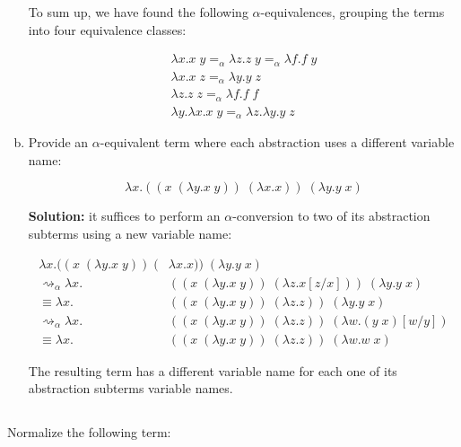 \documentclass{article}
\begin{document}
\begin{enumerate}[a)]
    To sum up, we have found the following $\alpha$-equivalences,
    grouping the terms into four equivalence classes:

    \begin{gather*}
      \lambda x.x\;y 
        =_\alpha \lambda z.z\;y 
        =_\alpha \lambda f.f\;y \\ 
      \lambda x.x\;z 
        =_\alpha \lambda y.y\;z \\ 
      \lambda z.z\;z
        =_\alpha \lambda f.f\;f \\ 
      \lambda y.\lambda x.x\;y 
        =_\alpha \lambda z.\lambda y.y\;z
    \end{gather*}

  \item Provide an $\alpha$-equivalent term where each abstraction 
    uses a different variable name:

    $$
      \lambda x.
        ((x\;(\lambda y.x\;y))\;(\lambda x.x))\;
        (\lambda y.y\;x)
    $$

    \textbf{Solution:} it suffices to perform an 
    $\alpha$-conversion to two of its abstraction subterms 
    using a new variable name:

    \begin{align*}
      \lambda x.
        ((x\;(\lambda y.x\;y))\;(&\lambda x.x))\;
        (\lambda y.y\;x) \\
      \rightsquigarrow_\alpha\lambda x.
        &((x\;(\lambda y.x\;y))\;(\lambda z.x[z/x]))\;
        (\lambda y.y\;x) \\
      \equiv\lambda x.
        &((x\;(\lambda y.x\;y))\;(\lambda z.z))\;
        (\lambda y.y\;x) \\
      \rightsquigarrow_\alpha\lambda x.
        &((x\;(\lambda y.x\;y))\;(\lambda z.z))\;
        (\lambda w.(y\;x)[w/y]) \\
      \equiv\lambda x.
        &((x\;(\lambda y.x\;y))\;(\lambda z.z))\;
        (\lambda w.w\;x)
    \end{align*}

    The resulting term has a different variable name for each 
    one of its abstraction subterms variable names.

\end{enumerate}

\subsection{}\label{ex:2}

Normalize the following term: 
\end{document}
